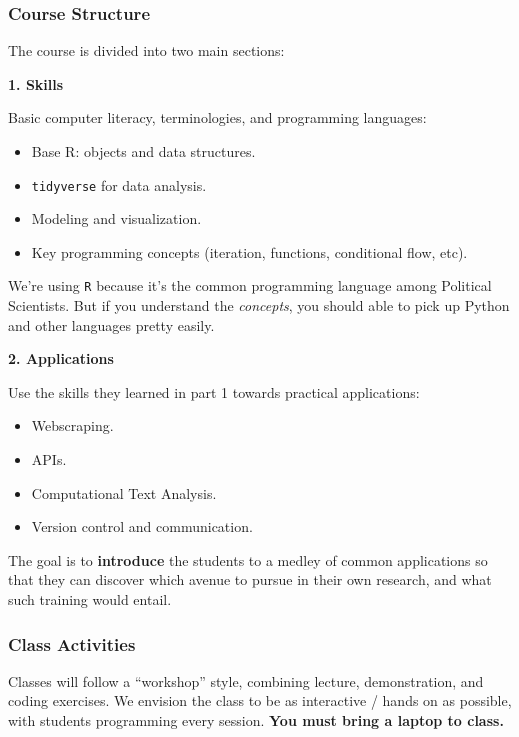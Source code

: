 \documentclass[]{book}
\providecommand{\tightlist}{%
  \setlength{\itemsep}{0pt}\setlength{\parskip}{0pt}}
\begin{document}
\hypertarget{course-structure-1}{%
\subsubsection*{Course Structure}\label{course-structure-1}}

The course is divided into two main sections:

\textbf{1. Skills}

Basic computer literacy, terminologies, and programming languages:

\begin{itemize}
\tightlist
\item
  Base R: objects and data structures.
\item
  \texttt{tidyverse} for data analysis.
\item
  Modeling and visualization.
\item
  Key programming concepts (iteration, functions, conditional flow, etc).
\end{itemize}

We're using \texttt{R} because it's the common programming language among Political Scientists. But if you understand the \emph{concepts}, you should able to pick up Python and other languages pretty easily.

\textbf{2. Applications}

Use the skills they learned in part 1 towards practical applications:

\begin{itemize}
\tightlist
\item
  Webscraping.
\item
  APIs.
\item
  Computational Text Analysis.
\item
  Version control and communication.
\end{itemize}

The goal is to \textbf{introduce} the students to a medley of common applications so that they can discover which avenue to pursue in their own research, and what such training would entail.

\hypertarget{class-activities}{%
\subsubsection*{Class Activities}\label{class-activities}}

Classes will follow a ``workshop'' style, combining lecture, demonstration, and coding exercises. We envision the class to be as interactive / hands on as possible, with students programming every session. \textbf{You must bring a laptop to class.}
\end{document}
